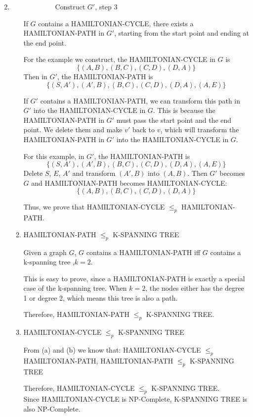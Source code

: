 \documentclass[12pt,a4paper]{article}
\makeatletter
\newtheorem*{solution}{Solution}
\theoremstyle{definition}
\renewenvironment{solution}[1][Solution] {\par\pushQED{\qed}\normalfont\topsep6\p@\@plus6\p@\relax\trivlist\item[\hskip\labelsep\bfseries#1\@addpunct{.}]\ignorespaces}{\popQED\endtrivlist\@endpefalse} \makeatother
\makeatother
\begin{document}
\begin{enumerate}
\begin{solution}
\begin{enumerate}
\begin{enumerate}
\begin{figure}[H]
            \caption{Construct $G'$, step 3}
            \label{fig2}
        \end{figure}
    \end{enumerate}
    
    If $G$ contains a HAMILTONIAN-CYCLE, there exists a HAMILTONIAN-PATH in $G'$, starting from the start point and ending at the end point.
    
    For the example we construct, the HAMILTONIAN-CYCLE in $G$ is $$\{(A,B),(B,C),(C,D),(D,A)\}$$ Then in $G'$, the HAMILTONIAN-PATH is $$\{(S,A'),(A',B),(B,C),(C,D),(D,A),(A,E)\}$$
    
    If $G'$ contains a HAMILTONIAN-PATH, we can transform this path in $G'$ into the HAMILTONIAN-CYCLE in $G$. This is because the HAMILTONIAN-PATH in $G'$ must pass the start point and the end point. We delete them  and make $v'$ back to $v$, which will transform the HAMILTONIAN-PATH in $G'$ into the HAMILTONIAN-CYCLE in $G$.
    
    For this example, in $G'$, the HAMILTONIAN-PATH is $$\{(S,A'),(A',B),(B,C),(C,D),(D,A),(A,E)\}$$
    Delete $S$, $E$, $A'$ and transform $(A',B)$ into $(A,B)$. Then $G'$ becomes $G$ and HAMILTONIAN-PATH becomes HAMILTONIAN-CYCLE:
     $$\{(A,B),(B,C),(C,D),(D,A)\}$$
     
     Thus, we prove that HAMILTONIAN-CYCLE $\leq_p$ HAMILTONIAN-PATH.
     
     \item 
     HAMILTONIAN-PATH $\leq_p$ K-SPANNING TREE
     
     Given a graph $G$, $G$ contains a HAMILTONIAN-PATH iff $G$ contains a k-spanning tree ,$k=2$.
     
     This is easy to prove, since a HAMILTONIAN-PATH is exactly a special case of the k-spanning tree. When $k=2$, the nodes either has the degree 1 or degree 2, which means this tree is also a path. 
     
     Therefore,  HAMILTONIAN-PATH $\leq_p$ K-SPANNING TREE.
     
     \item HAMILTONIAN-CYCLE $\leq_p$ K-SPANNING TREE
     
     From (a) and (b) we know that:
     HAMILTONIAN-CYCLE $\leq_p$ HAMILTONIAN-PATH, 
    HAMILTONIAN-PATH $\leq_p$ K-SPANNING TREE
    
    Therefore, HAMILTONIAN-CYCLE $\leq_p$ K-SPANNING TREE. 
    ~\\
    
    Since HAMILTONIAN-CYCLE is NP-Complete, K-SPANNING TREE is also NP-Complete.
    

\end{enumerate}
\end{solution}
\end{enumerate}
\end{document}
